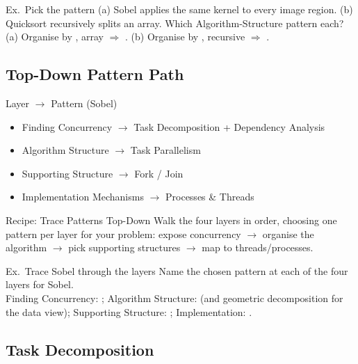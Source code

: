 \begin{example2}{Ex.\ Pick the pattern}
    (a) Sobel applies the same kernel to every image region. (b) Quicksort recursively splits an array. Which Algorithm-Structure pattern each?
     \\ 
    (a) Organise by , array $\Rightarrow$ . (b) Organise by , recursive $\Rightarrow$ .
\end{example2}



\subsection{Top-Down Pattern Path}

\begin{concept}{Layer $\to$ Pattern (Sobel)}
    \begin{itemize}
        \item Finding Concurrency $\to$ Task Decomposition + Dependency Analysis
        \item Algorithm Structure $\to$ Task Parallelism
        \item Supporting Structure $\to$ Fork / Join
        \item Implementation Mechanisms $\to$ Processes \& Threads
    \end{itemize}
\end{concept}

\begin{KR}{Recipe: Trace Patterns Top-Down}
    Walk the four layers in order, choosing one pattern per layer for your problem: expose concurrency $\to$ organise the algorithm $\to$ pick supporting structures $\to$ map to threads/processes.
\end{KR}

\begin{example2}{Ex.\ Trace Sobel through the layers}
    Name the chosen pattern at each of the four layers for Sobel.
     \\ 
    Finding Concurrency: ; Algorithm Structure:  (and geometric decomposition for the data view); Supporting Structure: ; Implementation: .
\end{example2}

\subsection{Task Decomposition}

